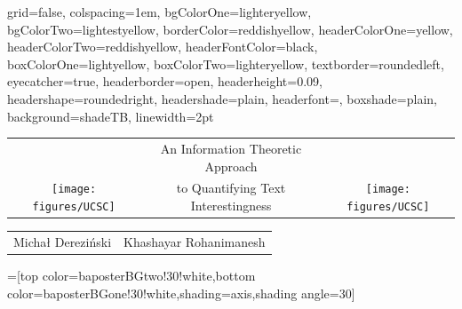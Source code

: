 \documentclass[portrait,a0paper]{baposter-templ/baposter}
\let\polishl\l
\begin{document}
\newlength{\leftimgwidth}
\begin{poster}%
  {
  grid=false,
  colspacing=1em,
  bgColorOne=lighteryellow,
  bgColorTwo=lightestyellow,
  borderColor=reddishyellow,
  headerColorOne=yellow,
  headerColorTwo=reddishyellow,
  headerFontColor=black,
  boxColorOne=lightyellow,
  boxColorTwo=lighteryellow,
  textborder=roundedleft,
  eyecatcher=true,
  headerborder=open,
  headerheight=0.09\textheight,
  headershape=roundedright,
  headershade=plain,
  headerfont=\Large\textsf, %
  boxshade=plain,
  background=shadeTB,
  linewidth=2pt
  }
  {} %
  {\sf 
\begin{tabular}{c@{\qquad}c@{\qquad}c}
& An Information Theoretic Approach & \\
\texttt{[image: figures/UCSC]} 
& to Quantifying Text Interestingness &
\texttt{[image: figures/UCSC]} 
\end{tabular}
 \vspace{.3em}}
{\sf %
\begin{tabular}{c@{\qquad\qquad}c}%
Micha{\polishl} Derezi\'{n}ski &
Khashayar Rohanimanesh
\\
\end{tabular}
%
%
\vspace{-.5em} %
}
{}
=[top color=baposterBGtwo!30!white,bottom color=baposterBGone!30!white,shading=axis,shading angle=30]




\end{poster}
\end{document}
